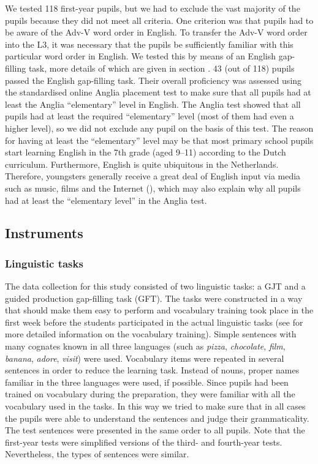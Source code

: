\documentclass[output=paper]{langsci/langscibook}
\begin{document}
We tested 118 first-year pupils, but we had to exclude the vast majority of the pupils because they did not meet all criteria. One criterion was that pupils had to be aware of the Adv-V word order in English. To transfer the Adv-V word order into the L3, it was necessary that the pupils be sufficiently familiar with this particular word order in English. We tested this by means of an English gap-filling task, more details of which are given in section . 43 (out of 118) pupils passed the English gap-filling task. Their overall proficiency was assessed using the standardised online Anglia placement test to make sure that all pupils had at least the Anglia ``elementary'' level in English. The Anglia test showed that all pupils had at least the required ``elementary'' level (most of them had even a higher level), so we did not exclude any pupil on the basis of this test. The reason for having at least the ``elementary'' level may be that most primary school pupils start learning English in the 7th grade (aged 9–11) according to the Dutch curriculum. Furthermore, English is quite ubiquitous in the Netherlands. Therefore, youngsters generally receive a great deal of English input via media such as music, films and the Internet (\citealt{VerspoorEtAl2007, VerspoorEtAl2010}), which may also explain why all pupils had at least the ``elementary level'' in the Anglia test.

\subsection{{Instruments} }%
\label{sec:stadt:3.3}
\subsubsection{{Linguistic} {tasks} }%
\label{sec:stadt:3.3.1}

The data collection for this study consisted of two linguistic tasks: a GJT and a guided production gap-filling task (GFT). The tasks were constructed in a way that should make them easy to perform and vocabulary training took place in the first week before the students participated in the actual linguistic tasks (see  for more detailed information on the vocabulary training). Simple sentences with many cognates known in all three languages (such as \textit{pizza}, \textit{chocolate}, \textit{film}, \textit{banana}, \textit{adore}, \textit{visit}) were used. Vocabulary items were repeated in several sentences in order to reduce the learning task. Instead of nouns, proper names familiar in the three languages were used, if possible. Since pupils had been trained on vocabulary during the preparation, they were familiar with all the vocabulary used in the tasks. In this way we tried to make sure that in all cases the pupils were able to understand the sentences and judge their grammaticality. The test sentences were presented in the same order to all pupils. Note that the first-year tests were simplified versions of the third- and fourth-year tests. Nevertheless, the types of sentences were similar.
\end{document}
